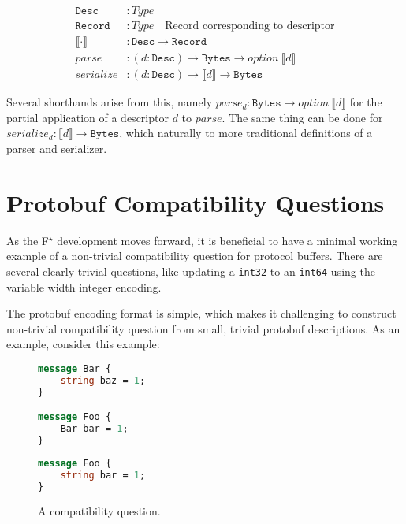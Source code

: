 \documentclass[11pt]{article}
\newcommand{\fstar}{F\(^\star\)}
\theoremstyle{definition}
\begin{document}
\begin{align*}
	\mathtt{Desc}               & : Type                                                                             \\
	\mathtt{Record}             & : Type \quad \text{Record corresponding to descriptor}                             \\
	\llbracket \cdot \rrbracket & : \mathtt{Desc} \rightarrow \mathtt{Record}                                        \\
	parse                       & : (d:\mathtt{Desc}) \rightarrow \mathtt{Bytes} \rightarrow option\
	\llbracket d \rrbracket                                                                                          \\
	serialize                   & : (d:\mathtt{Desc}) \rightarrow \llbracket d \rrbracket \rightarrow \mathtt{Bytes}
\end{align*}

Several shorthands arise from this, namely $parse_d : \mathtt{Bytes} \rightarrow option\
	\llbracket d \rrbracket$ for the partial application of a descriptor $d$ to
$parse$. The same thing can be done for $serialize_d : \llbracket d \rrbracket \rightarrow
	\mathtt{Bytes}$, which naturally to more traditional definitions of a parser and serializer.

\section{Protobuf Compatibility Questions}

As the \fstar{} development moves forward, it is beneficial to have a minimal
working example of a non-trivial compatibility question for protocol
buffers. There are several clearly trivial questions, like updating a
\texttt{int32} to an \texttt{int64} using the variable width integer encoding.

The protobuf encoding format is simple, which makes it challenging to construct
non-trivial compatibility question from small, trivial protobuf descriptions. As
an example, consider this example:

\begin{figure}[H]
	\centering
	\begin{minipage}[bt]{0.4\textwidth}
		\begin{lstlisting}[language=proto]
message Bar {
    string baz = 1;
}

message Foo {
    Bar bar = 1;
}\end{lstlisting}
	\end{minipage}
	\hspace{1cm}
	\begin{minipage}[bt]{0.4\textwidth}
		\begin{lstlisting}[language=proto]
message Foo {
    string bar = 1;
}\end{lstlisting}
	\end{minipage}

	\caption[]{A compatibility question.}
\end{figure}
\end{document}
